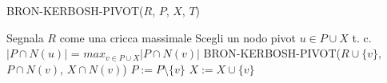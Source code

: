 \begin{algorithm}[H]
    \caption{BRON-KERBOSH-PIVOT($R$, $P$, $X$, $T$)}\label{alg:bk2}
    \begin{algorithmic}[1]
            \State Segnala $R$ come una cricca massimale
        \Else
            \State Scegli un nodo pivot $u\in P\cup X$ t. c. $|P \cap N(u)|$ = $max_{v \in P \cup X}|P \cap N(v)|$
                \State BRON-KERBOSH-PIVOT($R \cup \{v\},$ $P \cap N(v)$, $X \cap N(v)$)
                \State $P:=P \setminus \{v\}$
                \State $X:=X \cup \{v\}$
            \EndFor
        \EndIf
    \end{algorithmic}
\end{algorithm}
